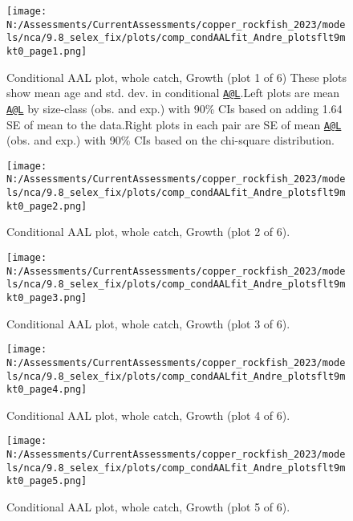\documentclass[11pt,
  english,
  letterpaper,
]{article}
\begin{document}
\begin{figure}
\centering
\texttt{[image: N:/Assessments/CurrentAssessments/copper\_rockfish\_2023/models/nca/9.8\_selex\_fix/plots/comp\_condAALfit\_Andre\_plotsflt9mkt0\_page1.png]}
\caption{Conditional AAL plot, whole catch, Growth (plot 1 of 6) These plots show mean age and std. dev. in conditional \href{mailto:A@L}{\nolinkurl{A@L}}.Left plots are mean \href{mailto:A@L}{\nolinkurl{A@L}} by size-class (obs. and exp.) with 90\% CIs based on adding 1.64 SE of mean to the data.Right plots in each pair are SE of mean \href{mailto:A@L}{\nolinkurl{A@L}} (obs. and exp.) with 90\% CIs based on the chi-square distribution.\label{fig:comp_condAALfit_Andre_plotsflt9mkt0_page1}}
\end{figure}

\begin{figure}
\centering
\texttt{[image: N:/Assessments/CurrentAssessments/copper\_rockfish\_2023/models/nca/9.8\_selex\_fix/plots/comp\_condAALfit\_Andre\_plotsflt9mkt0\_page2.png]}
\caption{Conditional AAL plot, whole catch, Growth (plot 2 of 6).\label{fig:comp_condAALfit_Andre_plotsflt9mkt0_page2}}
\end{figure}

\begin{figure}
\centering
\texttt{[image: N:/Assessments/CurrentAssessments/copper\_rockfish\_2023/models/nca/9.8\_selex\_fix/plots/comp\_condAALfit\_Andre\_plotsflt9mkt0\_page3.png]}
\caption{Conditional AAL plot, whole catch, Growth (plot 3 of 6).\label{fig:comp_condAALfit_Andre_plotsflt9mkt0_page3}}
\end{figure}

\begin{figure}
\centering
\texttt{[image: N:/Assessments/CurrentAssessments/copper\_rockfish\_2023/models/nca/9.8\_selex\_fix/plots/comp\_condAALfit\_Andre\_plotsflt9mkt0\_page4.png]}
\caption{Conditional AAL plot, whole catch, Growth (plot 4 of 6).\label{fig:comp_condAALfit_Andre_plotsflt9mkt0_page4}}
\end{figure}

\begin{figure}
\centering
\texttt{[image: N:/Assessments/CurrentAssessments/copper\_rockfish\_2023/models/nca/9.8\_selex\_fix/plots/comp\_condAALfit\_Andre\_plotsflt9mkt0\_page5.png]}
\caption{Conditional AAL plot, whole catch, Growth (plot 5 of 6).\label{fig:comp_condAALfit_Andre_plotsflt9mkt0_page5}}
\end{figure}
\end{document}
